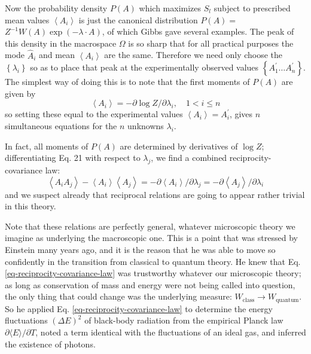 \documentclass{article}
\begin{document}
Now the probability density $P(A)$ which maximizes $S_l$ subject to prescribed mean values $\left\langle A_i\right\rangle$ is just the canonical distribution $P(A)=$ $Z^{-1} W(A) \exp (-\lambda \cdot A)$, of which Gibbs gave several examples. The peak of this density in the macrospace $\Omega$ is so sharp that for all practical purposes the mode $\hat{A}_i$ and mean $\left\langle A_i\right\rangle$ are the same. Therefore we need only choose the $\left\{\lambda_i\right\}$ so as to place that peak at the experimentally observed values $\left\{A_1^{\prime} \ldots A_n^{\prime}\right\}$. The simplest way of doing this is to note that the first moments of $P(A)$ are given by
\begin{equation}
\left\langle A_i\right\rangle=-\partial \log Z / \partial \lambda_i, \quad 1<i \leqslant n
\end{equation}
so setting these equal to the experimental values $\left\langle A_i\right\rangle=A_i^{\prime}$, gives $n$ simultaneous equations for the $n$ unknowns $\lambda_i$.

In fact, all moments of $P(A)$ are determined by derivatives of $\log Z$; differentiating Eq. 21 with respect to $\lambda_j$, we find a combined reciprocity-covariance law:
\begin{equation}
\left\langle A_i A_j\right\rangle-\left\langle A_i\right\rangle\left\langle A_j\right\rangle=-\partial\left\langle A_i\right\rangle / \partial \lambda_j=-\partial\left\langle A_j\right\rangle / \partial \lambda_i \label{eq-reciprocity-covariance-law}
\end{equation}
and we suspect already that reciprocal relations are going to appear rather trivial in this theory.

Note that these relations are perfectly general, whatever microscopic theory we imagine as underlying the macroscopic one. This is a point that was stressed by Einstein many years ago, and it is the reason that he was able to move so confidently in the transition from classical to quantum theory. He knew that Eq. \ref{eq-reciprocity-covariance-law} was trustworthy whatever our microscopic theory; as long as conservation of mass and energy were not being called into question, the only thing that could change was the underlying measure: $W_{\text{class}} \rightarrow W_{\text{quantum}}$. So he applied Eq. \ref{eq-reciprocity-covariance-law} to determine the energy fluctuations $(\Delta E)^2$ of black-body radiation from the empirical Planck law $\partial\langle E\rangle / \partial T$, noted a term identical with the fluctuations of an ideal gas, and inferred the existence of photons.
\end{document}
